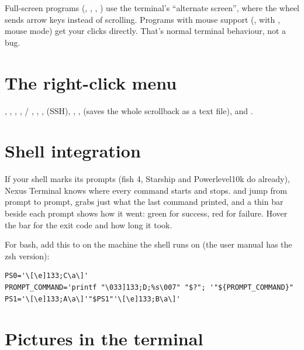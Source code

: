 \begin{sidequest}
Full-screen programs (, , , ) use the terminal's ``alternate screen'', where the
wheel sends arrow keys instead of scrolling. Programs with mouse support (,  with
,  mouse mode) get your clicks directly. That's normal terminal behaviour, not a bug.
\end{sidequest}

\section{The right-click menu}

, , , ,  / , , ,  (SSH), , ,  (saves the
whole scrollback as a text file),  and .

\section{Shell integration}

If your shell marks its prompts (fish 4, Starship and Powerlevel10k do already), Nexus Terminal knows where every
command starts and stops.  and  jump from prompt to prompt,
 grabs just what the last command printed, and a thin bar beside each prompt shows how it
went: green for success, red for failure. Hover the bar for the exit code and how long it took.


For bash, add this to  on the machine the shell runs on (the user manual has the zsh
version):

\begin{verbatim}
PS0='\[\e]133;C\a\]'
PROMPT_COMMAND='printf "\033]133;D;%s\007" "$?"; '"${PROMPT_COMMAND}"
PS1='\[\e]133;A\a\]'"$PS1"'\[\e]133;B\a\]'
\end{verbatim}

\section{Pictures in the terminal}

